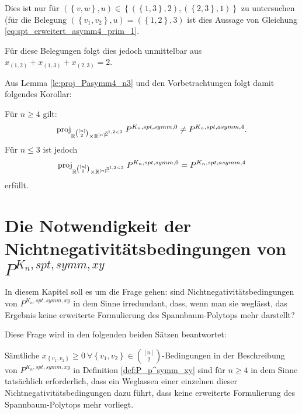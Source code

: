\documentclass[10p,a4paper,BCOR = 12mm, DIV=15]{scrbook}
\begin{document}
{\begin{bew}
Dies ist nur für $\left(\left\{v, w\right\}, u\right) \in \left\{\left(\left\{1, 3\right\}, 2\right), \left(\left\{2, 3\right\}, 1\right)\right\}$ zu untersuchen 
(für die Belegung $\left(\left\{v_1, v_2\right\}, u\right) = \left(\left\{1, 2\right\}, 3\right)$ ist dies Aussage von Gleichung \eqref{eq:spt_erweitert_asymm4_prim_1}.

Für diese Belegungen folgt dies jedoch unmittelbar aus $x_{\left(1, 2\right)} + x_{\left(1, 3\right)} + x_{\left(2, 3\right)} = 2$.
\end{bew}

Aus Lemma \ref{le:proj_Pasymm4_n3} und den Vorbetrachtungen folgt damit folgendes Korollar:
\begin{Kor}
Für $n\geq 4$ gilt:
\begin{displaymath}
\operatorname{proj}_{\mathbb{R}^{\left[n\right] \choose 2} \times \mathbb{R}^{\left[n\right]^{\underline{3}^{1,2<3}}}} P^{K_n, spt, symm, 0} \neq P^{K_n, spt, asymm, 4}.
\end{displaymath}
Für $n\leq 3$ ist jedoch
\begin{displaymath}
\operatorname{proj}_{\mathbb{R}^{\left[n\right] \choose 2} \times \mathbb{R}^{\left[n\right]^{\underline{3}^{1,2<3}}}} P^{K_n, spt, symm, 0} = P^{K_n, spt, asymm, 4}
\end{displaymath}
erfüllt.
\end{Kor}

\chapter{Die Notwendigkeit der Nichtnegativitätsbedingungen von $P^{K_n, spt, symm, xy}$}

In diesem Kapitel soll es um die Frage gehen: sind Nichtnegativitätsbedingungen von $P^{K_n, spt, symm, xy}$ in dem Sinne irredundant, dass, wenn man sie weglässt, das Ergebnis keine erweiterte Formulierung des Spannbaum-Polytops mehr darstellt?

Diese Frage wird in den folgenden beiden Sätzen beantwortet:

\begin{Sa}
Sämtliche $x_{\left\{v_1, v_2\right\}}\geq 0 \ \forall \left\{v_1, v_2\right\} \in {\left[n\right] \choose 2}$-Bedingungen in der Beschreibung von $P^{K_n, spt, symm, xy}$ in Definition \ref{def:P_p^symm_xy} sind für $n\geq 4$ in dem Sinne tatsächlich erforderlich, dass ein Weglassen einer einzelnen dieser Nichtnegativitätsbedingungen dazu führt, dass keine erweiterte Formulierung des Spannbaum-Polytops mehr vorliegt.


\end{Sa}}
\end{document}
